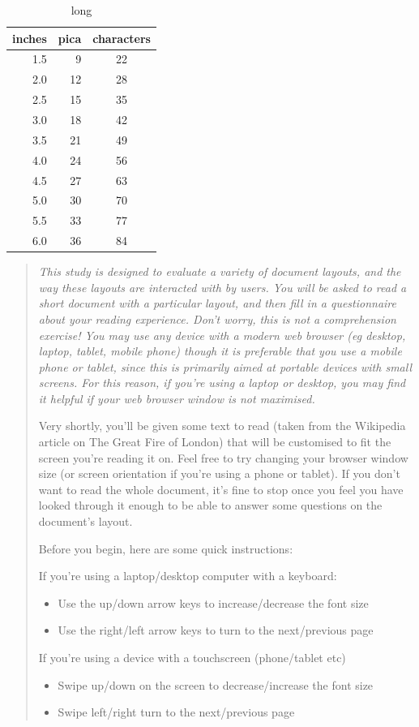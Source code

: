 \begin{table}
\begin{center}
 \begin{tabular}{rrc}
\toprule
inches & pica & characters \\
\midrule
1.5 & 9 & 22 \\
2.0 & 12 & 28 \\
2.5 & 15 & 35 \\
3.0 & 18 & 42 \\
3.5 & 21 & 49 \\
4.0 & 24 & 56 \\
4.5 & 27 & 63 \\
5.0 & 30 & 70 \\
5.5 & 33 & 77 \\
6.0 & 36 & 84 \\
\bottomrule
\end{tabular}
\end{center}
\caption[short]{long}
\end{table}


\begin{quote}
{\slshape
This study is designed to evaluate a variety of document layouts, and the way these layouts are interacted with by users. You will be asked to read a short document with a particular layout, and then fill in a questionnaire about your reading experience. Don't worry, this is not a comprehension exercise! You may use any device with a modern web browser (eg desktop, laptop, tablet, mobile phone) \emph{though it is preferable that you use a mobile phone or tablet, since this is primarily aimed at portable devices with small screens}. For this reason, if you're using a laptop or desktop, you may find it helpful if your web browser window is not maximised.

Very shortly, you'll be given some text to read (taken from the Wikipedia article on The Great Fire of London) that will be customised to fit the screen you're reading it on. Feel free to try changing your browser window size (or screen orientation if you're using a phone or tablet). If you don't want to read the whole document, it's fine to stop once you feel you have looked through it enough to be able to answer some questions on the document's layout.

Before you begin, here are some quick instructions:

If you're using a laptop/desktop computer with a keyboard:
\begin{itemize}
\item Use the up/down arrow keys to increase/decrease the font size
\item Use the right/left arrow keys to turn to the next/previous page
\end{itemize}

If you're using a device with a touchscreen (phone/tablet etc)
\begin{itemize}
\item Swipe up/down on the screen to decrease/increase the font size
\item Swipe left/right turn to the next/previous page
\end{itemize}
}
\end{quote}


